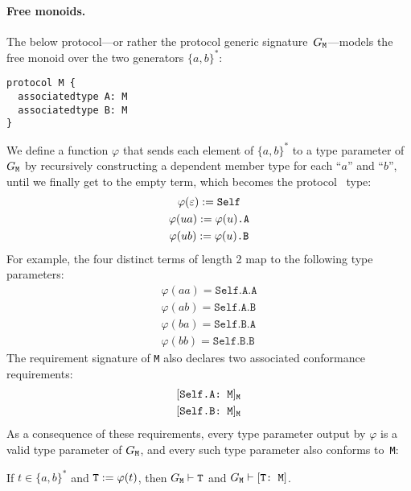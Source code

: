 \documentclass[../generics]{subfiles}
\begin{document}
\paragraph{Free monoids.} The below protocol---or rather the protocol generic signature~$G_\texttt{M}$---models the free monoid over the two generators $\{a,b\}^*$:
\begin{Verbatim}
protocol M {
  associatedtype A: M
  associatedtype B: M
}
\end{Verbatim}
We define a function $\varphi$ that sends each element of $\{a,b\}^*$ to a type parameter of $G_\texttt{M}$ by recursively constructing a dependent member type for each ``$a$'' and ``$b$'', until we finally get to the empty term, which becomes the protocol \tSelf\ type:
\begin{gather*}
\varphi(\varepsilon):=\texttt{Self}\\
\varphi(ua):=\texttt{$\varphi(u)$.A}\\
\varphi(ub):=\texttt{$\varphi(u)$.B}
\end{gather*}
For example, the four distinct terms of length 2 map to the following type parameters:
\begin{gather*}
\varphi(aa)=\texttt{Self.A.A}\\
\varphi(ab)=\texttt{Self.A.B}\\
\varphi(ba)=\texttt{Self.B.A}\\
\varphi(bb)=\texttt{Self.B.B}
\end{gather*}
The requirement signature of \texttt{M} also declares two associated conformance requirements:
\begin{gather*}
\AssocConfReq{Self.A}{M}{M}\\
\AssocConfReq{Self.B}{M}{M}
\end{gather*}
As a consequence of these requirements, every type parameter output by $\varphi$ is a valid type parameter of $G_\texttt{M}$, and every such type parameter also conforms to~\texttt{M}:
\begin{proposition}\label{monoid type lemma} If $t\in \{a,b\}^*$ and $\texttt{T}:=\varphi(t)$, then $G_\texttt{M}\vdash\texttt{T}$ and $G_\texttt{M}\vdash[\texttt{T:~M}]$.
\end{proposition}
\end{document}
